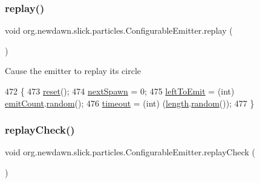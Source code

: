 \subsubsection{\texorpdfstring{replay()}{replay()}}
{\footnotesize\ttfamily void org.\+newdawn.\+slick.\+particles.\+Configurable\+Emitter.\+replay (\begin{DoxyParamCaption}{ }\end{DoxyParamCaption})\hspace{0.3cm}{\ttfamily [inline]}}

Cause the emitter to replay it\textquotesingle{}s circle 
\begin{DoxyCode}
472                          \{
473         \mbox{\hyperlink{classorg_1_1newdawn_1_1slick_1_1particles_1_1_configurable_emitter_a6aeb253b52df08647d4f1f6710b76cbe}{reset}}();
474         \mbox{\hyperlink{classorg_1_1newdawn_1_1slick_1_1particles_1_1_configurable_emitter_a29294edce5adae3a522d3486a6805030}{nextSpawn}} = 0;
475         \mbox{\hyperlink{classorg_1_1newdawn_1_1slick_1_1particles_1_1_configurable_emitter_a3bbb120034b27280fb242f61f3f8e039}{leftToEmit}} = (int) \mbox{\hyperlink{classorg_1_1newdawn_1_1slick_1_1particles_1_1_configurable_emitter_ada09b861f9d81935e3fb2729e2660871}{emitCount}}.\mbox{\hyperlink{classorg_1_1newdawn_1_1slick_1_1particles_1_1_configurable_emitter_1_1_range_adc19242ab1467fd1a8578eebbc09b416}{random}}();
476         \mbox{\hyperlink{classorg_1_1newdawn_1_1slick_1_1particles_1_1_configurable_emitter_ac35e9ad9b1c5a0fc37e533fd32153fc4}{timeout}} = (int) (\mbox{\hyperlink{classorg_1_1newdawn_1_1slick_1_1particles_1_1_configurable_emitter_afe1766fe8f366d2eb6d051877a9920e9}{length}}.\mbox{\hyperlink{classorg_1_1newdawn_1_1slick_1_1particles_1_1_configurable_emitter_1_1_range_adc19242ab1467fd1a8578eebbc09b416}{random}}());
477     \}
\end{DoxyCode}
\mbox{\label{classorg_1_1newdawn_1_1slick_1_1particles_1_1_configurable_emitter_af6c9f05ac6c5323c4f29d9bc6d5d1228}} 
\subsubsection{\texorpdfstring{replay\+Check()}{replayCheck()}}
{\footnotesize\ttfamily void org.\+newdawn.\+slick.\+particles.\+Configurable\+Emitter.\+replay\+Check (\begin{DoxyParamCaption}{ }\end{DoxyParamCaption})\hspace{0.3cm}{\ttfamily [inline]}}

